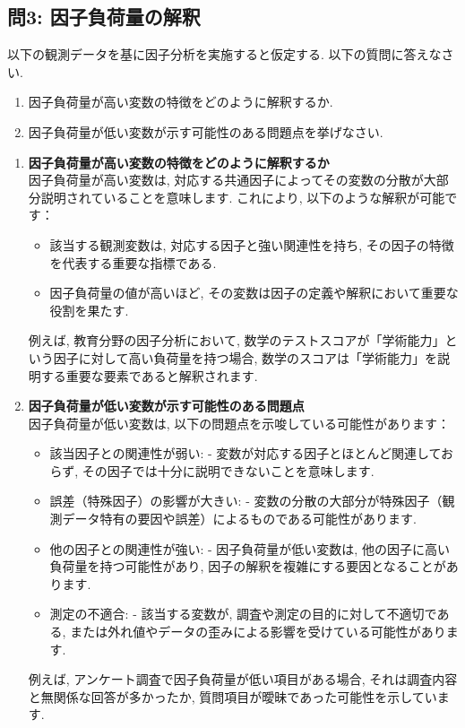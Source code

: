\documentclass[dvipdfmx, 10pt]{jsarticle}
\begin{document}
\subsection*{問3: 因子負荷量の解釈}
以下の観測データを基に因子分析を実施すると仮定する. 以下の質問に答えなさい. 
\begin{enumerate}
    \item 因子負荷量が高い変数の特徴をどのように解釈するか. 
    \item 因子負荷量が低い変数が示す可能性のある問題点を挙げなさい. 
\end{enumerate}

\begin{enumerate}
    \item \textbf{因子負荷量が高い変数の特徴をどのように解釈するか} \\
    因子負荷量が高い変数は, 対応する共通因子によってその変数の分散が大部分説明されていることを意味します. これにより, 以下のような解釈が可能です：
    \begin{itemize}
        \item 該当する観測変数は, 対応する因子と強い関連性を持ち, その因子の特徴を代表する重要な指標である. 
        \item 因子負荷量の値が高いほど, その変数は因子の定義や解釈において重要な役割を果たす. 
    \end{itemize}
    例えば, 教育分野の因子分析において, 数学のテストスコアが「学術能力」という因子に対して高い負荷量を持つ場合, 数学のスコアは「学術能力」を説明する重要な要素であると解釈されます. 

    \item \textbf{因子負荷量が低い変数が示す可能性のある問題点} \\
    因子負荷量が低い変数は, 以下の問題点を示唆している可能性があります：
    \begin{itemize}
        \item 該当因子との関連性が弱い:
            - 変数が対応する因子とほとんど関連しておらず, その因子では十分に説明できないことを意味します. 
        \item 誤差（特殊因子）の影響が大きい:
            - 変数の分散の大部分が特殊因子（観測データ特有の要因や誤差）によるものである可能性があります. 
        \item 他の因子との関連性が強い:
            - 因子負荷量が低い変数は, 他の因子に高い負荷量を持つ可能性があり, 因子の解釈を複雑にする要因となることがあります. 
        \item 測定の不適合:
            - 該当する変数が, 調査や測定の目的に対して不適切である, または外れ値やデータの歪みによる影響を受けている可能性があります. 
    \end{itemize}
    例えば, アンケート調査で因子負荷量が低い項目がある場合, それは調査内容と無関係な回答が多かったか, 質問項目が曖昧であった可能性を示しています. 
\end{enumerate}
\end{document}
